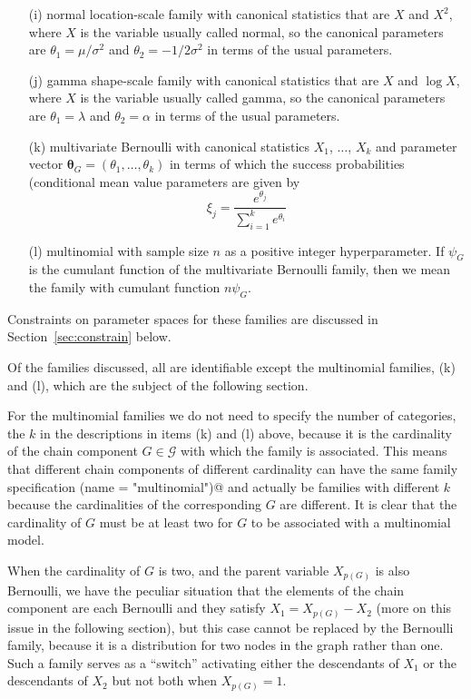 \documentclass[11pt]{article}
\newcommand{\boldtheta}{\boldsymbol{\theta}}
\begin{document}
\begin{enumerate}
\item[(i)] normal location-scale family with canonical statistics that
    are $X$ and $X^2$, where $X$ is the variable usually called normal,
    so the canonical parameters are $\theta_1 = \mu / \sigma^2$ and
    $\theta_2 = - 1 / 2 \sigma^2$ in terms of the usual parameters.
\item[(j)] gamma shape-scale family with canonical statistics that
    are $X$ and $\log X$, where $X$ is the variable usually called gamma,
    so the canonical parameters are $\theta_1 = \lambda$
    and $\theta_2 = \alpha$ in terms of the usual parameters.
\item[(k)] multivariate Bernoulli with canonical statistics $X_1$, $\ldots$,
    $X_k$ and parameter vector $\boldtheta_G = (\theta_1, \ldots, \theta_k)$
    in terms of which the success probabilities (conditional mean value
    parameters are given by
$$
   \xi_j = \frac{e^{\theta_j}}{\sum_{i = 1}^k e^{\theta_i}}
$$
\item[(l)] multinomial with sample size $n$ as a positive integer
    hyperparameter.
    If $\psi_G$ is the cumulant function of the multivariate Bernoulli family,
    then we mean the family with cumulant function $n \psi_G$.
\end{enumerate}

Constraints on parameter spaces for these families are discussed
in Section~\ref{sec:constrain} below.

Of the families discussed, all are identifiable except the multinomial
families, (k) and (l), which are the subject of the following section.

For the multinomial families we do not need to specify
the number of categories, the $k$ in the descriptions in items (k) and (l)
above, because it is the cardinality of the chain component $G \in \mathcal{G}$
with which the family is associated.  This means that different chain
components of different cardinality can have the same family specification
\verb@list(name = "multinomial")@ and actually be families with different
$k$ because the cardinalities of the corresponding $G$ are different.
It is clear that the cardinality of $G$ must be at least two for $G$
to be associated with a multinomial model.

When the cardinality of $G$ is two, and the parent variable $X_{p(G)}$ is
also Bernoulli, we have the peculiar situation that the elements of the
chain component are each Bernoulli and they satisfy $X_1 = X_{p(G)} - X_2$
(more on this issue in the following section), but this case
cannot be replaced by the Bernoulli family, because it is a distribution
for two nodes in the graph rather than one.  Such a family serves as a
``switch'' activating either the descendants of $X_1$ or the descendants
of $X_2$ but not both when $X_{p(G)} = 1$.
\end{document}
